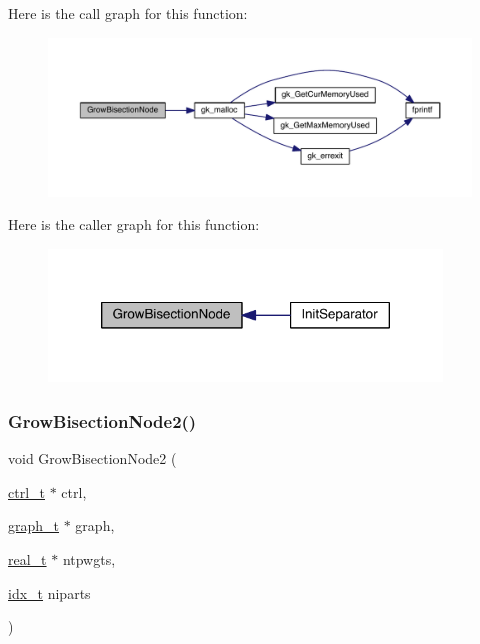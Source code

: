 Here is the call graph for this function\+:\nopagebreak
\begin{figure}[H]
\begin{center}
\leavevmode
\includegraphics[width=350pt]{a00945_a5882ab0f565a5e97581ad5c4847effbc_cgraph}
\end{center}
\end{figure}
Here is the caller graph for this function\+:\nopagebreak
\begin{figure}[H]
\begin{center}
\leavevmode
\includegraphics[width=296pt]{a00945_a5882ab0f565a5e97581ad5c4847effbc_icgraph}
\end{center}
\end{figure}
\mbox{\label{a00945_a3668b93d256689991e65a85536f533c5}} 
\subsubsection{\texorpdfstring{Grow\+Bisection\+Node2()}{GrowBisectionNode2()}}
{\footnotesize\ttfamily void Grow\+Bisection\+Node2 (\begin{DoxyParamCaption}\item[{\hyperlink{a00742}{ctrl\+\_\+t} $\ast$}]{ctrl,  }\item[{\hyperlink{a00734}{graph\+\_\+t} $\ast$}]{graph,  }\item[{\hyperlink{a00876_a1924a4f6907cc3833213aba1f07fcbe9}{real\+\_\+t} $\ast$}]{ntpwgts,  }\item[{\hyperlink{a00876_aaa5262be3e700770163401acb0150f52}{idx\+\_\+t}}]{niparts }\end{DoxyParamCaption})}

